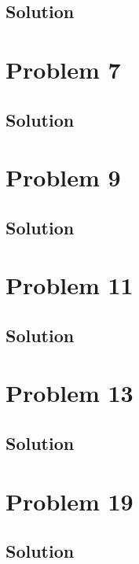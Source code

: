 \documentclass[12pt]{article}
\begin{document}
        \subsection{Solution}

    \pagebreak
    \section{Problem 7}

        \subsection{Solution}

    \pagebreak
    \section{Problem 9}

        \subsection{Solution}

    \pagebreak
    \section{Problem 11}

        \subsection{Solution}

    \pagebreak
    \section{Problem 13}

        \subsection{Solution}

    \pagebreak
    \section{Problem 19}

        \subsection{Solution}

    \pagebreak
\end{document}
